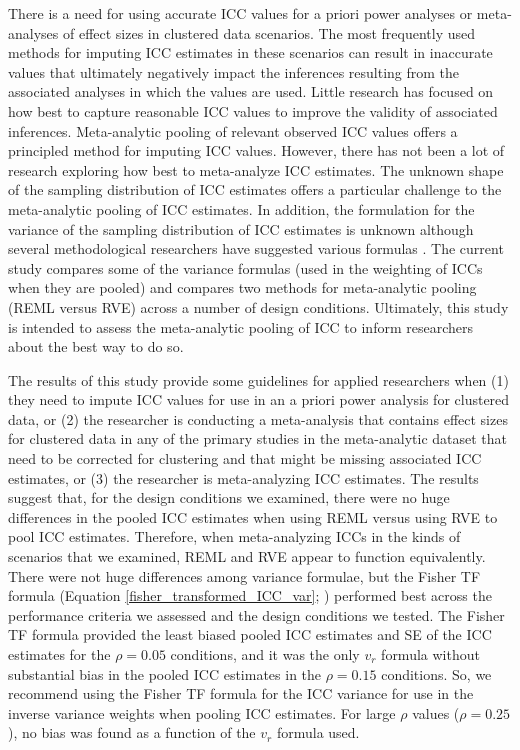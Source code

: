 There is a need for using accurate ICC values for a priori power analyses or meta-analyses of effect sizes in clustered data scenarios. The most frequently used methods for imputing ICC estimates in these scenarios can result in inaccurate values that ultimately negatively impact the inferences resulting from the associated analyses in which the values are used. Little research has focused on how best to capture reasonable ICC values to improve the validity of associated inferences. Meta-analytic pooling of relevant observed ICC values offers a principled method for imputing ICC values. However, there has not been a lot of research exploring how best to meta-analyze ICC estimates. The unknown shape of the sampling distribution of ICC estimates offers a particular challenge to the meta-analytic pooling of ICC estimates. In addition, the formulation for the variance of the sampling distribution of ICC estimates is unknown although several methodological researchers have suggested various formulas \cite{fisherTheoryStatisticalEstimation1925, hedgesVarianceIntraclassCorrelations2012, donner1980a, smith1957, swiger1964, fisher1970statistical}. The current study compares some of the variance formulas (used in the weighting of ICCs when they are pooled) and compares two methods for meta-analytic pooling (REML versus RVE) across a number of design conditions. Ultimately, this study is intended to assess the meta-analytic pooling of ICC to inform researchers about the best way to do so.  

The results of this study provide some guidelines for applied researchers when (1) they need to impute ICC values for use in an a priori power analysis for clustered data, or (2) the researcher is conducting a meta-analysis that contains effect sizes for clustered data in any of the primary studies in the meta-analytic dataset that need to be corrected for clustering and that might be missing associated ICC estimates, or (3) the researcher is meta-analyzing ICC estimates. The results suggest that, for the design conditions we examined, there were no huge differences in the pooled ICC estimates when using REML versus using RVE to pool ICC estimates. Therefore, when meta-analyzing ICCs in the kinds of scenarios that we examined, REML and RVE appear to function equivalently. There were not huge differences among variance formulae, but the Fisher TF formula (Equation \ref{fisher_transformed_ICC_var}; ) performed best across the performance criteria we assessed and the design conditions we tested. The Fisher TF formula provided the least biased pooled ICC estimates and SE of the ICC estimates for the $\rho=0.05$ conditions, and it was the only $v_r$ formula without substantial bias in the pooled ICC estimates in the $\rho = 0.15$ conditions.  So, we recommend using the Fisher TF formula for the ICC variance for use in the inverse variance weights when pooling ICC estimates. For large $\rho$ values ($\rho=0.25$), no bias was found as a function of the $v_r$ formula used. 

